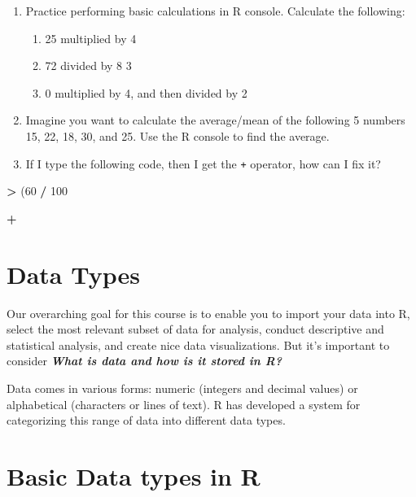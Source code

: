 \documentclass[
]{book}
\newenvironment{Shaded}{\begin{snugshade}}{\end{snugshade}}
\newcommand{\DecValTok}[1]{\textcolor[rgb]{0.00,0.00,0.81}{#1}}
\newcommand{\NormalTok}[1]{#1}
\newcommand{\SpecialCharTok}[1]{\textcolor[rgb]{0.81,0.36,0.00}{\textbf{#1}}}
\providecommand{\tightlist}{%
  \setlength{\itemsep}{0pt}\setlength{\parskip}{0pt}}
\begin{document}
\begin{enumerate}
\def\labelenumi{\arabic{enumi}.}
\tightlist
\item
  Practice performing basic calculations in R console. Calculate the following:

  \begin{enumerate}
  \def\labelenumii{\arabic{enumii}.}
  \tightlist
  \item
    25 multiplied by 4
  \item
    72 divided by 8 3
  \item
    0 multiplied by 4, and then divided by 2
  \end{enumerate}
\item
  Imagine you want to calculate the average/mean of the following 5 numbers 15, 22, 18, 30, and 25. Use the R console to find the average.
\item
  If I type the following code, then I get the \texttt{+} operator, how can I fix it?
\end{enumerate}

\begin{Shaded}
\begin{Highlighting}[]
\SpecialCharTok{\textgreater{}}\NormalTok{ (}\DecValTok{60} \SpecialCharTok{/} \DecValTok{100}
   
\SpecialCharTok{+}   
\end{Highlighting}
\end{Shaded}

\hypertarget{data-types}{%
\section{Data Types}\label{data-types}}

Our overarching goal for this course is to enable you to import your data into R, select the most relevant subset of data for analysis, conduct descriptive and statistical analysis, and create nice data visualizations. But it's important to consider \textbf{\emph{What is data and how is it stored in R?}}

Data comes in various forms: numeric (integers and decimal values) or alphabetical (characters or lines of text). R has developed a system for categorizing this range of data into different data types.

\hypertarget{basic-data-types-in-r}{%
\section{Basic Data types in R}\label{basic-data-types-in-r}}
\end{document}
